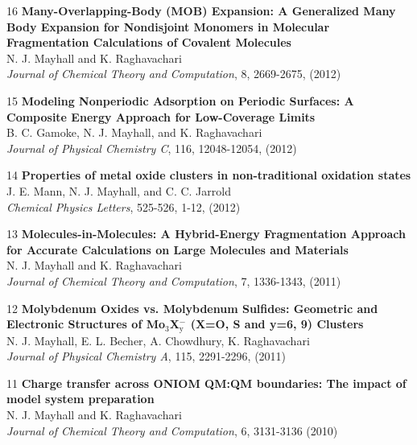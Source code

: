 \documentclass[10pt]{article}
\newenvironment{lonelist}[1][\enskip\textbullet]%
        {\vspace{-\baselineskip}\begin{list}{#1}{%
        \setlength{\partopsep}{0pt}%
        \setlength{\topsep}{0pt}}}
        {\end{list}\vspace{-.6\baselineskip}}
\begin{document}
\begin{lonelist}
\item [16\hspace{4pt}]
\textbf{Many-Overlapping-Body (MOB) Expansion: A Generalized Many Body Expansion for Nondisjoint Monomers in Molecular Fragmentation Calculations of Covalent Molecules} \\
N. J. Mayhall and K. Raghavachari \\
\textsl{Journal of Chemical Theory and Computation}, 8, 2669-2675, (2012)

\item[15\hspace{4pt}] \textbf{Modeling Nonperiodic Adsorption on Periodic Surfaces: A Composite Energy Approach for Low-Coverage Limits}\\
B. C. Gamoke, N. J. Mayhall, and K. Raghavachari \\
\textsl{Journal of Physical Chemistry C}, 116, 12048-12054, (2012)

\item[14\hspace{4pt}] \textbf{Properties of metal oxide clusters in non-traditional oxidation states}\\
J. E. Mann, N. J. Mayhall, and C. C. Jarrold\\
 \textsl{Chemical Physics Letters}, 525-526, 1-12, (2012)

\item[13\hspace{4pt}] \textbf{Molecules-in-Molecules: A Hybrid-Energy Fragmentation Approach for Accurate Calculations on Large Molecules and Materials}\\
N. J. Mayhall and K. Raghavachari\\
\textsl{Journal of Chemical Theory and Computation}, 7, 1336-1343, (2011)

\item[12\hspace{4pt}] \textbf{Molybdenum Oxides vs. Molybdenum Sulfides: Geometric and Electronic Structures of Mo$_3$X$_\text{y}^−$ (X=O, S and y=6, 9) Clusters}\\
N. J. Mayhall, E. L. Becher, A. Chowdhury, K. Raghavachari\\
\textsl{Journal of Physical Chemistry A}, 115, 2291-2296, (2011)

\item[11\hspace{4pt}] \textbf{Charge transfer across ONIOM QM:QM boundaries: The impact of model system preparation}\\
N. J. Mayhall and K. Raghavachari\\
 \textsl{Journal of Chemical Theory and Computation}, 6, 3131-3136 (2010)


\end{lonelist}
\end{document}
